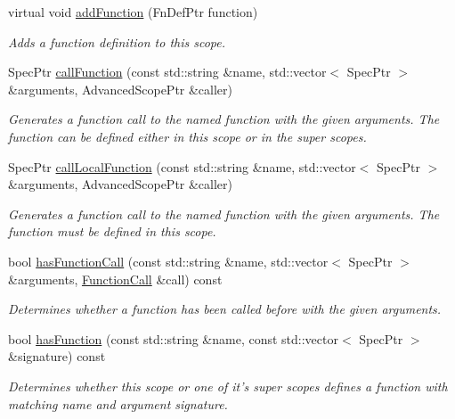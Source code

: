 \begin{DoxyCompactItemize}
virtual void \hyperlink{classgiskard__suturo_1_1AdvancedScope_a00d4f842341d0bda0af8e6a7fe5a1746}{add\-Function} (Fn\-Def\-Ptr function)
\begin{DoxyCompactList}\small\item\em Adds a function definition to this scope. \end{DoxyCompactList}\item 
Spec\-Ptr \hyperlink{classgiskard__suturo_1_1AdvancedScope_a5f51209c16c4267f4dea99ea66780e68}{call\-Function} (const std\-::string \&name, std\-::vector$<$ Spec\-Ptr $>$ \&arguments, Advanced\-Scope\-Ptr \&caller)
\begin{DoxyCompactList}\small\item\em Generates a function call to the named function with the given arguments. The function can be defined either in this scope or in the super scopes. \end{DoxyCompactList}\item 
Spec\-Ptr \hyperlink{classgiskard__suturo_1_1AdvancedScope_a155e1556e7180712c939cb63c7904ee4}{call\-Local\-Function} (const std\-::string \&name, std\-::vector$<$ Spec\-Ptr $>$ \&arguments, Advanced\-Scope\-Ptr \&caller)
\begin{DoxyCompactList}\small\item\em Generates a function call to the named function with the given arguments. The function must be defined in this scope. \end{DoxyCompactList}\item 
bool \hyperlink{classgiskard__suturo_1_1AdvancedScope_ab3e2735f8e0e947dbb76a6bae17f63a4}{has\-Function\-Call} (const std\-::string \&name, std\-::vector$<$ Spec\-Ptr $>$ \&arguments, \hyperlink{structgiskard__suturo_1_1FunctionCall}{Function\-Call} \&call) const 
\begin{DoxyCompactList}\small\item\em Determines whether a function has been called before with the given arguments. \end{DoxyCompactList}\item 
bool \hyperlink{classgiskard__suturo_1_1AdvancedScope_a613ef84fadf020dc111737499db7b8bb}{has\-Function} (const std\-::string \&name, const std\-::vector$<$ Spec\-Ptr $>$ \&signature) const 
\begin{DoxyCompactList}\small\item\em Determines whether this scope or one of it's super scopes defines a function with matching name and argument signature. \end{DoxyCompactList}\item 

\end{DoxyCompactItemize}
